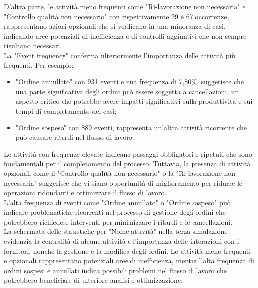 \documentclass{article}
\begin{document}
D'altra parte, le attività meno frequenti come "Ri-lavorazione non necessaria" e "Controllo qualità non necessario" con rispettivamente 29 e 67 occorrenze, rappresentano azioni opzionali che si verificano in una minoranza di casi, indicando aree potenziali di inefficienza o di controlli aggiuntivi che non sempre risultano necessari.\\
La "Event frequency" conferma ulteriormente l'importanza delle attività più frequenti. Per esempio:
\begin{itemize}
    \item "Ordine annullato" con 931 eventi e una frequenza di 7,80\%, suggerisce che una parte significativa degli ordini può essere soggetta a cancellazioni, un aspetto critico che potrebbe avere impatti significativi sulla produttività e sui tempi di completamento dei casi;
    \item "Ordine sospeso" con 889 eventi, rappresenta un'altra attività ricorrente che può causare ritardi nel flusso di lavoro.
\end{itemize}
Le attività con frequenze elevate indicano passaggi obbligatori e ripetuti che sono fondamentali per il completamento del processo. Tuttavia, la presenza di attività opzionali come il "Controllo qualità non necessario" o la "Ri-lavorazione non necessaria" suggerisce che vi siano opportunità di miglioramento per ridurre le operazioni ridondanti e ottimizzare il flusso di lavoro.\\
L'alta frequenza di eventi come "Ordine annullato" o "Ordine sospeso" può indicare problematiche ricorrenti nel processo di gestione degli ordini che potrebbero richiedere interventi per minimizzare i ritardi e le cancellazioni.\\
La schermata delle statistiche per "Nome attività" nella terza simulazione evidenzia la centralità di alcune attività e l'importanza delle interazioni con i fornitori, nonché la gestione e la modifica degli ordini. Le attività meno frequenti e opzionali rappresentano potenziali aree di inefficienza, mentre l'alta frequenza di ordini sospesi e annullati indica possibili problemi nel flusso di lavoro che potrebbero beneficiare di ulteriore analisi e ottimizzazione.\\
\end{document}
